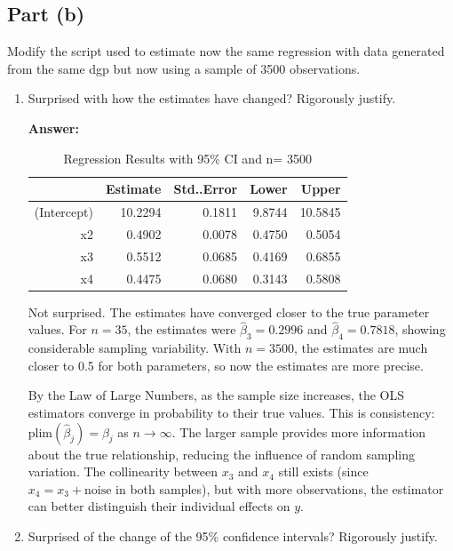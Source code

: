 \documentclass[12pt,a4paper]{article}
\begin{document}
\subsection*{Part (b)}
Modify the script used to estimate now the same regression with data 
generated from the same dgp but now using a sample of 3500 observations.

\begin{enumerate}[label=(\roman*)]
  \item Surprised with how the estimates have changed? Rigorously justify.
  
  \textbf{Answer:} 

  \begin{table}[ht]
\centering
\caption{Regression Results with 95\% CI and n= 3500} 
\label{tab:regression2}
\begin{tabular}{rrrrr}
  \hline
 & Estimate & Std..Error & Lower & Upper \\ 
  \hline
(Intercept) & 10.2294 & 0.1811 & 9.8744 & 10.5845 \\ 
  x2 & 0.4902  & 0.0078  & 0.4750 & 0.5054 \\ 
  x3 &0.5512 &  0.0685 & 0.4169 & 0.6855 \\ 
  x4 & 0.4475 & 0.0680 & 0.3143 & 0.5808 \\ 
   \hline
\end{tabular}
\end{table}
  
  Not surprised. The estimates have converged closer to the true parameter values. For $n=35$, the estimates were $\hat{\beta}_3=0.2996$ 
  and $\hat{\beta}_4=0.7818$, showing considerable sampling variability. 
  With $n=3500$, the estimates are much closer to 0.5 for both parameters, so now the estimates are more precise.
  
   By the Law of Large Numbers, as the sample size increases, the OLS estimators 
  converge in probability to their true values. This is consistency: 
  $\text{plim}(\hat{\beta}_j) = \beta_j$ as $n \to \infty$. The larger 
  sample provides more information about the true relationship, reducing 
  the influence of random sampling variation. The collinearity between $x_3$ 
  and $x_4$ still exists (since $x_4 = x_3 + \text{noise}$ in both samples), 
  but with more observations, the estimator can better distinguish their 
  individual effects on $y$.
  
  
  \item Surprised of the change of the 95\% confidence intervals? Rigorously justify.
  

\end{enumerate}
\end{document}
